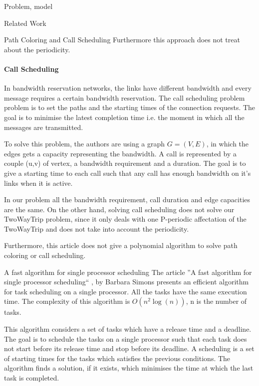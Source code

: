 \documentclass[a4paper,10pt]{report}
\begin{document}
\begin{chapter}{Problem, model}
\begin{section}{Related Work}
\begin{subsection}{Path Coloring and Call Scheduling}
Furthermore this approach does not treat about the periodicity.


\paragraph{Call Scheduling}
In bandwidth reservation networks, the links have different bandwidth and every message 
requires a certain bandwidth reservation. The call scheduling problem problem is to set the paths and the starting times of the connection requests.
The goal is to minimise the latest completion time i.e. the moment in which all the messages are transmitted.

To solve this problem, the authors are using a graph $G=(V,E)$, in which the edges gets a capacity representing the bandwidth.
A call is represented by a couple (u,v) of vertex, a bandwidth requirement and a duration. The goal is to give a starting time to each call
such that any call has enough bandwidth on it's links when it is active.

In our problem all the bandwidth requirement, call duration and edge capacities are the same.
On the other hand, solving call scheduling does not solve our TwoWayTrip problem, since it only deals with one P-periodic affectation of the TwoWayTrip and does not take into account the periodicity.

Furthermore, this article does not give a polynomial algorithm to solve path coloring or call scheduling.

\end{subsection}

\begin{subsection}{A fast algorithm for single processor scheduling}
The article ''A fast algorithm for single processor scheduling`` \cite{simons1978fast}, by Barbara Simons presents an efficient algorithm for task 
scheduling on a single processor. All the tasks have the same execution time. The complexity of this algorithm is $O(n^2\log(n))$, n is the number of tasks.

This algorithm considers a set of tasks which have a release time and a deadline. The goal is to schedule the tasks on a single processor such
that each task does not start before its release time and stop before its deadline.
A scheduling is a set of starting times for the tasks which satisfies the previous conditions.
The algorithm finds a solution, if it exists, which minimises the time at which the last task is completed.


\end{subsection}
\end{section}
\end{chapter}
\end{document}
